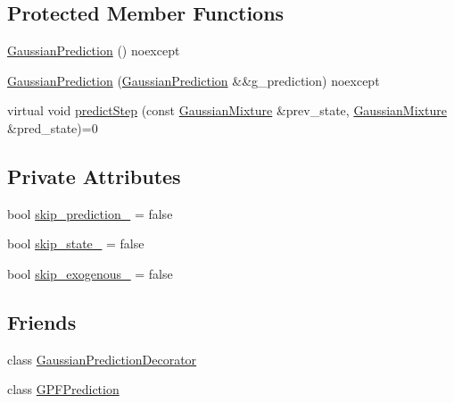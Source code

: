 \subsection*{Protected Member Functions}
\begin{DoxyCompactItemize}
\item 
\mbox{\hyperlink{classbfl_1_1GaussianPrediction_aacb5ac9c1fdf4e53c84fb681c650c680}{Gaussian\+Prediction}} () noexcept
\item 
\mbox{\hyperlink{classbfl_1_1GaussianPrediction_a8673dfd2a3fbbf84ec99db86f28860e6}{Gaussian\+Prediction}} (\mbox{\hyperlink{classbfl_1_1GaussianPrediction}{Gaussian\+Prediction}} \&\&g\+\_\+prediction) noexcept
\item 
virtual void \mbox{\hyperlink{classbfl_1_1GaussianPrediction_a35e7c490378c9bb48e4becad7fdcb2a1}{predict\+Step}} (const \mbox{\hyperlink{classbfl_1_1GaussianMixture}{Gaussian\+Mixture}} \&prev\+\_\+state, \mbox{\hyperlink{classbfl_1_1GaussianMixture}{Gaussian\+Mixture}} \&pred\+\_\+state)=0
\end{DoxyCompactItemize}
\subsection*{Private Attributes}
\begin{DoxyCompactItemize}
\item 
bool \mbox{\hyperlink{classbfl_1_1GaussianPrediction_a957fc640d2737bf98107ab59b5a4afbf}{skip\+\_\+prediction\+\_\+}} = false
\item 
bool \mbox{\hyperlink{classbfl_1_1GaussianPrediction_a666cc032dab917985809e2851b0af743}{skip\+\_\+state\+\_\+}} = false
\item 
bool \mbox{\hyperlink{classbfl_1_1GaussianPrediction_a15963cb3fce6d30dccc7ca8eb2297573}{skip\+\_\+exogenous\+\_\+}} = false
\end{DoxyCompactItemize}
\subsection*{Friends}
\begin{DoxyCompactItemize}
\item 
class \mbox{\hyperlink{classbfl_1_1GaussianPrediction_a6270a27fe93ac0118907f8cbd64005c8}{Gaussian\+Prediction\+Decorator}}
\item 
class \mbox{\hyperlink{classbfl_1_1GaussianPrediction_a698dcea28e3e0e4b41438a53c8b53a17}{G\+P\+F\+Prediction}}
\end{DoxyCompactItemize}


